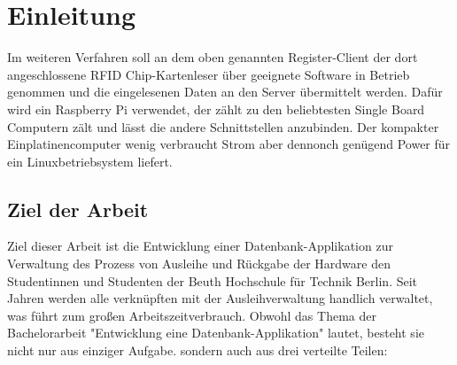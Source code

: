 \chapter{Einleitung}
\label{sec:intro}

Im weiteren Verfahren soll an dem oben genannten Register-Client der dort angeschlossene RFID Chip-Kartenleser über geeignete Software in Betrieb genommen und die eingelesenen Daten an den Server übermittelt werden. Dafür wird ein Raspberry Pi verwendet, der zählt zu den beliebtesten Single Board Computern zält und lässt die andere Schnittstellen anzubinden. Der kompakter Einplatinencomputer wenig verbraucht Strom aber dennonch genügend Power für ein Linuxbetriebsystem liefert. 

\section{Ziel der Arbeit}
\label{sec:intro:goal}
Ziel dieser Arbeit ist die Entwicklung einer Datenbank-Applikation zur Verwaltung des Prozess von Ausleihe und Rückgabe der Hardware den Studentinnen und Studenten der Beuth Hochschule für Technik Berlin. Seit Jahren werden alle verknüpften mit der Ausleihverwaltung handlich verwaltet, was führt zum großen Arbeitszeitverbrauch. Obwohl das Thema der Bachelorarbeit "Entwicklung eine Datenbank-Applikation" lautet, besteht sie nicht nur aus einziger Aufgabe. sondern auch aus drei verteilte Teilen:
